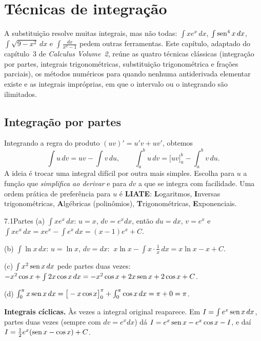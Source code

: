 \chapter{Técnicas de integração}

A substituição resolve muitas integrais, mas não todas: $\int xe^x\,dx$, $\int\operatorname{sen}^4x\,dx$,
$\int\sqrt{9-x^2}\,dx$ e $\int\frac{dx}{x^2-1}$ pedem outras ferramentas. Este capítulo, adaptado
do capítulo~3 de \emph{Calculus Volume~2}, reúne as quatro técnicas clássicas (integração por
partes, integrais trigonométricas, substituição trigonométrica e frações parciais), os métodos
numéricos para quando nenhuma antiderivada elementar existe e as integrais impróprias, em que
o intervalo ou o integrando são ilimitados.

\section{Integração por partes}

Integrando a regra do produto $(uv)'=u'v+uv'$, obtemos
\[
\int u\,dv=uv-\int v\,du,\qquad
\int_a^bu\,dv=\Big[uv\Big]_a^b-\int_a^bv\,du .
\]
A ideia é trocar uma integral difícil por outra mais simples. Escolha para $u$ a função que
\emph{simplifica ao derivar} e para $dv$ a que se integra com facilidade. Uma ordem prática
de preferência para $u$ é \textbf{LIATE}: \textbf{L}ogaritmos, \textbf{I}nversas trigonométricas,
\textbf{A}lgébricas (polinômios), \textbf{T}rigonométricas, \textbf{E}xponenciais.

\begin{exemplo}{7.1}{Partes}
(a) $\int xe^x\,dx$: $u=x$, $dv=e^xdx$, então $du=dx$, $v=e^x$ e
$\int xe^x\,dx=xe^x-\int e^x\,dx=(x-1)e^x+C$.

(b) $\int\ln x\,dx$: $u=\ln x$, $dv=dx$:
$\ x\ln x-\int x\cdot\frac1x\,dx=x\ln x-x+C$.

(c) $\int x^2\operatorname{sen} x\,dx$ pede partes duas vezes:
$-x^2\cos x+\int2x\cos x\,dx=-x^2\cos x+2x\operatorname{sen} x+2\cos x+C$.

(d) $\int_0^\pi x\operatorname{sen} x\,dx=\big[-x\cos x\big]_0^\pi+\int_0^\pi\cos x\,dx=\pi+0=\pi$.
\end{exemplo}

\textbf{Integrais cíclicas.} Às vezes a integral original reaparece. Em
$I=\int e^x\operatorname{sen} x\,dx$, partes duas vezes (sempre com $dv=e^xdx$) dá
$I=e^x\operatorname{sen} x-e^x\cos x-I$, e daí $I=\tfrac12e^x(\operatorname{sen} x-\cos x)+C$.

